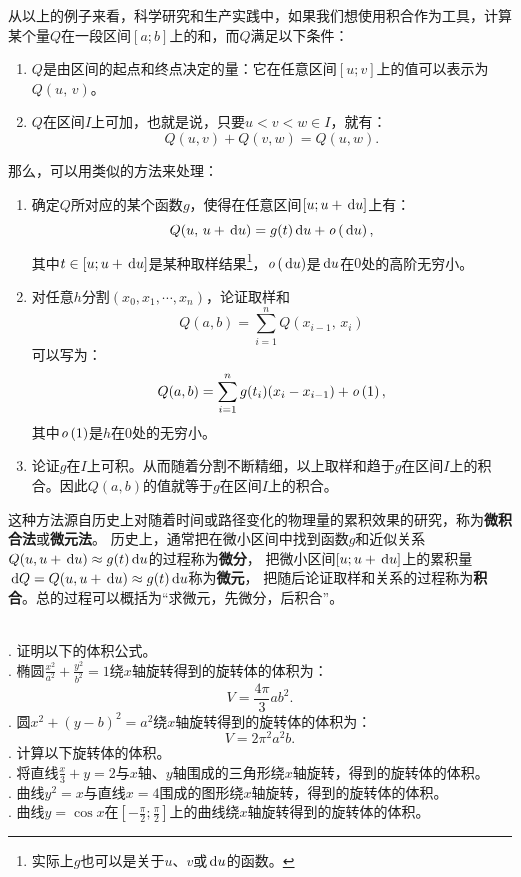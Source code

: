 \documentclass[12pt,UTF8]{ctexbook}
\begin{document}
从以上的例子来看，科学研究和生产实践中，如果我们想使用积合作为工具，计算某个量$Q$在一段区间$[a;b]$上的和，而$Q$满足以下条件：
\begin{enumerate}
    \item $Q$是由区间的起点和终点决定的量：它在任意区间$[u;v]$上的值可以表示为$Q(u,\, v)$。
    \item $Q$在区间$I$上可加，也就是说，只要$u < v < w \in I$，就有：
            $$ Q(u, v) + Q(v, w) = Q(u, w).$$
\end{enumerate}
那么，可以用类似的方法来处理：
\begin{enumerate}
    \item 确定$Q$所对应的某个函数$g$，使得在任意区间$[u;u + \,\mathrm{d}u]$上有：
    $$Q(u, \, u + \,\mathrm{d}u) = g(t)\,\mathrm{d}u + \mathit{o}\left(\,\mathrm{d}u\right),$$
    其中$t\in [u;u+ \,\mathrm{d}u]$是某种取样结果\footnote{实际上$g$也可以是关于$u$、$v$或$\,\mathrm{d}u$的函数。}，$\mathit{o}\left(\,\mathrm{d}u\right)$是$\,\mathrm{d}u$在$0$处的高阶无穷小。
    \item 对任意$h$\dash 分割$(x_0, x_1, \cdots, x_n)$，论证取样和
    $$Q(a, b) = \sum_{i=1}^n Q(x_{i-1},\, x_i)$$
    可以写为：
    $$Q(a, b) = \sum_{i=1}^n g(t_i)(x_i - x_{i-1}) + \mathit{o}\left(1\right),$$
    其中$\mathit{o}\left(1\right)$是$h$在$0$处的无穷小。
    \item 论证$g$在$I$上可积。从而随着分割不断精细，以上取样和趋于$g$在区间$I$上的积合。因此$Q(a, b)$的值就等于$g$在区间$I$上的积合。
\end{enumerate}
这种方法源自历史上对随着时间或路径变化的物理量的累积效果的研究，称为\textbf{微积合法}或\textbf{微元法}。
历史上，通常把在微小区间中找到函数$g$和近似关系$Q(u,u + \,\mathrm{d}u) \approx g(t)\,\mathrm{d}u$的过程称为\textbf{微分}，
把微小区间$[u;u+\,\mathrm{d}u]$上的累积量$\,\mathrm{d}Q = Q(u, u + \,\mathrm{d}u) \approx g(t)\,\mathrm{d}u$称为\textbf{微元}，
把随后论证取样和关系的过程称为\textbf{积合}。总的过程可以概括为“求微元，先微分，后积合”。


\begin{xt}
    \mbox{} \\
    . 证明以下的体积公式。\\
    . 椭圆$\displaystyle\frac{x^2}{a^2} + \frac{y^2}{b^2} = 1$绕$x$轴旋转得到的旋转体的体积为：
    $$ V = \frac{4\pi}{3} ab^2. $$
    . 圆$x^2 + (y - b)^2 = a^2$绕$x$轴旋转得到的旋转体的体积为：
    $$ V = 2\pi^2 a^2 b. $$
    . 计算以下旋转体的体积。\\
    . 将直线$\frac{x}{3} + y = 2$与$x$轴、$y$轴围成的三角形绕$x$轴旋转，得到的旋转体的体积。\\
    . 曲线$y^2 = x$与直线$x=4$围成的图形绕$x$轴旋转，得到的旋转体的体积。\\
    . 曲线$y = \cos{x}$在$\displaystyle\left[-\frac{\pi}{2};\frac{\pi}{2}\right]$上的曲线绕$x$轴旋转得到的旋转体的体积。
\end{xt}
\end{document}

